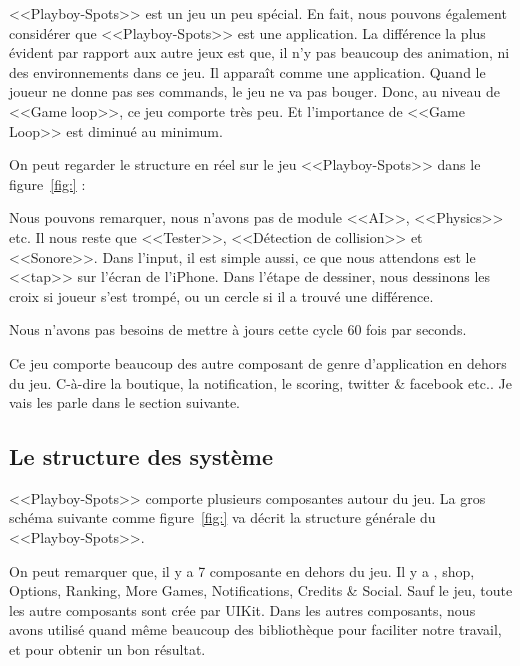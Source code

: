 <<Playboy-Spots>> est un jeu un peu spécial. En fait, nous pouvons également considérer que <<Playboy-Spots>> est une application. La différence la plus évident par rapport aux autre jeux est que, il n'y pas beaucoup des animation, ni des environnements dans ce jeu. Il apparaît comme une application. Quand le joueur ne donne pas ses commands, le jeu ne va pas bouger. Donc, au niveau de <<Game loop>>, ce jeu comporte très peu. Et l'importance de <<Game Loop>> est diminué au minimum. 

On peut regarder le structure en réel sur le jeu <<Playboy-Spots>> dans le figure~\ref{fig:} : 

Nous pouvons remarquer, nous n'avons pas de module <<AI>>, <<Physics>> etc. Il nous reste que <<Tester>>, <<Détection de collision>> et <<Sonore>>. Dans l'input, il est simple aussi, ce que nous attendons est le <<tap>> sur l'écran de l'iPhone. Dans l'étape de dessiner, nous dessinons les croix si joueur s'est trompé, ou un cercle si il a trouvé une différence.

Nous n'avons pas besoins de mettre à jours cette cycle 60 fois par seconds. 

Ce jeu comporte beaucoup des autre composant de genre d'application en dehors du jeu. C-à-dire la boutique, la notification, le scoring, twitter \& facebook etc..
Je vais les parle dans le section suivante.


\subsection{Le structure des système} %

<<Playboy-Spots>> comporte plusieurs composantes autour du jeu. La gros schéma suivante comme figure~\ref{fig:} va décrit la structure générale du <<Playboy-Spots>>.


On peut remarquer que, il y a 7 composante en dehors du jeu. Il y a , shop, Options, Ranking, More Games, Notifications, Credits \& Social. Sauf le jeu, toute les autre composants sont crée par UIKit. Dans les autres composants, nous avons utilisé quand même beaucoup des bibliothèque pour faciliter notre travail, et pour obtenir un bon résultat.

